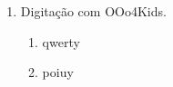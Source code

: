 \begin{enumerate}
	\item Digitação com OOo4Kids.
	\begin{enumerate}
		\item qwerty
		\item poiuy
	\end{enumerate}
\end{enumerate}

